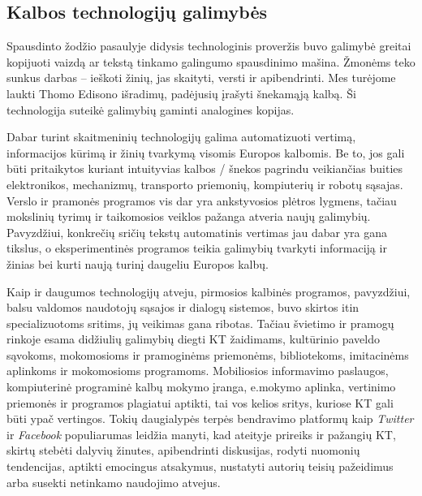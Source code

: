 \begin{multicols}{2}
\subsection{Kalbos technologijų galimybės}

Spausdinto žodžio pasaulyje didysis technologinis proveržis buvo galimybė greitai kopijuoti vaizdą ar tekstą  tinkamo galingumo spausdinimo mašina. Žmonėms teko sunkus darbas – ieškoti žinių, jas skaityti, versti ir apibendrinti. Mes turėjome laukti Thomo Edisono išradimų, padėjusių įrašyti šnekamąją kalbą. Ši technologija suteikė galimybių gaminti analogines kopijas.

Dabar turint skaitmeninių technologijų galima automatizuoti vertimą, informacijos kūrimą ir žinių tvarkymą visomis Europos kalbomis. Be to, jos gali būti pritaikytos kuriant intuityvias kalbos / šnekos pagrindu veikiančias buities elektronikos, mechanizmų, transporto priemonių, kompiuterių ir robotų sąsajas. Verslo ir pramonės programos vis dar yra ankstyvosios plėtros lygmens, tačiau mokslinių tyrimų ir taikomosios veiklos pažanga atveria naujų galimybių. Pavyzdžiui, konkrečių sričių tekstų automatinis vertimas jau dabar yra gana tikslus, o eksperimentinės programos teikia galimybių tvarkyti informaciją ir žinias bei kurti naują turinį daugeliu Europos kalbų. 

 Kaip ir daugumos technologijų atveju, pirmosios kalbinės programos, pavyzdžiui, balsu valdomos naudotojų sąsajos ir dialogų sistemos, buvo skirtos itin specializuotoms sritims, jų veikimas gana ribotas. Tačiau švietimo ir pramogų rinkoje esama didžiulių galimybių diegti KT žaidimams, kultūrinio paveldo sąvokoms, mokomosioms ir pramoginėms priemonėms, bibliotekoms, imitacinėms aplinkoms ir mokomosioms programoms. Mobiliosios informavimo paslaugos, kompiuterinė programinė kalbų mokymo įranga, e.mokymo aplinka, vertinimo priemonės ir programos plagiatui aptikti, tai vos kelios sritys, kuriose KT gali būti ypač vertingos. Tokių daugialypės terpės bendravimo platformų kaip \textit{Twitter} ir \textit{Facebook} populiarumas leidžia manyti, kad ateityje prireiks ir pažangių KT, skirtų stebėti dalyvių žinutes, apibendrinti diskusijas, rodyti nuomonių tendencijas, aptikti emocingus atsakymus, nustatyti autorių teisių pažeidimus arba susekti netinkamo naudojimo atvejus.



\end{multicols}
